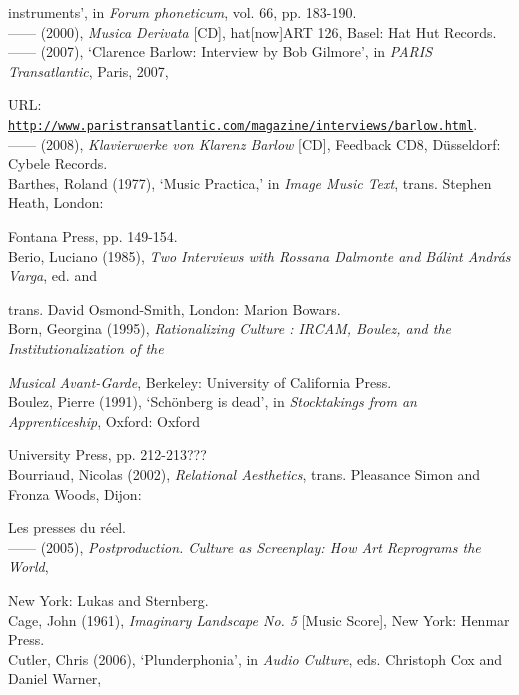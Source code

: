 instruments', in \emph{Forum phoneticum}, vol. 66, pp. 183-190.
\hypertarget{barlowcd}{}\\
------ (2000), \emph{Musica Derivata} [CD], hat[now]ART 126, Basel: Hat Hut Records. 
\hypertarget{barlowbob}{}\\
------ (2007), `Clarence Barlow: Interview by Bob Gilmore', in \emph{PARIS Transatlantic}, Paris, 2007, 

URL: \href{http://www.paristransatlantic.com/magazine/interviews/barlow.html}{\texttt {http://www.paristransatlantic.com/magazine/interviews/barlow.html}}.
\hypertarget{barlowpiano}{}\\
------ (2008), \emph{Klavierwerke von Klarenz Barlow} [CD], Feedback CD8, D\"{u}sseldorf: Cybele Records. 
\hypertarget{barthes}{}\\
Barthes, Roland (1977), `Music Practica,' in \emph{Image Music Text}, trans. Stephen Heath, London: 

Fontana Press, pp. 149-154. 
\hypertarget{berio}{}\\
Berio, Luciano (1985), \emph{Two Interviews with Rossana Dalmonte and B\'{a}lint Andr\'{a}s Varga},  ed. and 

trans. David Osmond-Smith, London: Marion Bowars. 
\hypertarget{born}{}\\
Born, Georgina (1995), \emph{Rationalizing Culture : IRCAM, Boulez, and the Institutionalization of the}

\emph{Musical Avant-Garde}, Berkeley: University of California Press. 
\hypertarget{boulez}{}\\
Boulez, Pierre (1991), `Sch\"{o}nberg is dead', in \emph{Stocktakings from an Apprenticeship}, Oxford: Oxford 

University Press, pp. 212-213??? 
\hypertarget{relational}{}\\
Bourriaud, Nicolas (2002), \emph{Relational Aesthetics}, trans. Pleasance Simon and Fronza Woods, Dijon: 

Les presses du r\'{e}el.
\hypertarget{postproduction}{}\\
------ (2005),  \emph{Postproduction. Culture as Screenplay: How Art Reprograms the World}, 

New York: Lukas and Sternberg.
\hypertarget{cage}{}\\
Cage, John (1961), \emph{Imaginary Landscape No. 5} [Music Score], New York: Henmar Press. 
\hypertarget{cutler}{}\\
Cutler, Chris (2006),  `Plunderphonia', in \emph{Audio Culture}, eds. Christoph Cox and Daniel Warner, 

